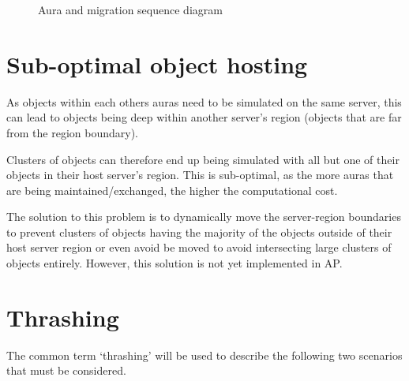 \begin{figure}[!t]
	\caption{Aura and migration sequence diagram}
	\label{sequence_diagram}
\end{figure}

\section{Sub-optimal object hosting}
As objects within each others auras need to be simulated on the same server, this can lead to objects being deep within another server's region (objects that are far from the region boundary).

Clusters of objects can therefore end up being simulated with all but one of their objects in their host server's region. This is sub-optimal, as the more auras that are being maintained/exchanged, the higher the computational cost.

The solution to this problem is to dynamically move the server-region boundaries to prevent clusters of objects having the majority of the objects outside of their host server region or even avoid be moved to avoid intersecting large clusters of objects entirely. However, this solution is not yet implemented in AP.

\section{Thrashing}\label{Thrashing}
The common term `thrashing' will be used to describe the following two scenarios that must be considered.

